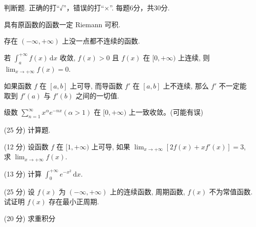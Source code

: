 \par{}
判断题. 正确的打“√”，错误的打“×”. 每题6分，共30分.\par
具有原函数的函数一定 Riemann 可积.\par
存在 $(- \infty, + \infty)$ 上没一点都不连续的函数.\par
若 $\int_{a}^{+\infty} f(x) \, \mathrm{d}x$ 收敛, $f(x) > 0$ 且 $f(x)$ 在 $[0, +\infty)$ 上连续, 则 $\lim_{x \to +\infty} f(x) = 0$.\par
如果函数 $f$ 在 $[a, b]$ 上可导, 而导函数 $f'$ 在 $[a, b]$ 上不连续, 那么 $f'$ 不一定能取到 $f'(a)$ 与 $f'(b)$ 之间的一切值.\par
级数 $\sum_{n=1}^{\infty} x^{\alpha} e^{-nx} (\alpha > 1)$ 在 $[0, +\infty)$ 上一致收敛。(可能有误)\par
\par{}
(25 分) 计算题.\par
(12 分) 设函数 $f$ 在 $[1, +\infty)$ 上可导, 如果 $\lim_{x \to +\infty} [2f(x) + xf'(x)] = 3$, 求 $\lim_{x \to +\infty} f(x)$.\par
(13 分) 计算 $\int_{0}^{+\infty} e^{-x^2} \, \mathrm{d}x$.\par
\par{}
(25 分) 设 $f(x)$ 为 $(- \infty, +\infty)$ 上的连续函数, 周期函数, $f(x)$ 不为常值函数. 试证明 $f(x)$ 存在最小正周期.\par
\par{}
\par{}
(20 分) 求重积分\par
\nopagebreak[4]
